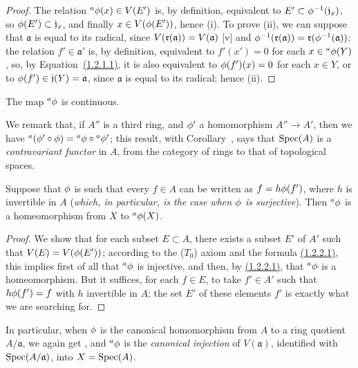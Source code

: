 \begin{proof}
\label{proof-1.1.2.2}
The relation ${}^a\phi(x)\in V(E')$ is, by definition, equivalent to $E'\subset\phi^{-1}(\mathfrak{j}_x)$, so $\phi(E')\subset\mathfrak{j}_x$, and finally $x\in V(\phi(E'))$, hence (i).
To prove (ii), we can suppose that $\mathfrak{a}$ is equal to its radical, since $V(\mathfrak{r}(\mathfrak{a}))=V(\mathfrak{a})$ [v] and $\phi^{-1}(\mathfrak{r}(\mathfrak{a}))=\mathfrak{r}(\phi^{-1}(\mathfrak{a}))$;
the relation $f'\in\mathfrak{a}'$ is, by definition, equivalent to $f'(x')=0$ for each $x\in{{}^a\phi(Y)}$, so, by Equation~\hyperref[1.1.2.1]{(1.2.1.1)}, it is also equivalent to $\phi(f')(x)=0$ for each $x\in Y$, or to $\phi(f')\in\mathfrak{j}(Y)=\mathfrak{a}$, since $\mathfrak{a}$ is equal to its radical;
hence (ii).
\end{proof}

\begin{corollary}[1.2.3]
\label{1.1.2.3}
The map ${}^a\phi$ is continuous.
\end{corollary}

We remark that, if $A''$ is a third ring, and $\phi'$ a homomorphism $A''\to A'$, then we have ${}^a(\phi'\circ\phi)={}^a\phi\circ{}^a\phi'$;
this result, with Corollary~, says that $\operatorname{Spec}(A)$ is a \emph{contravariant functor} in $A$, from the category of rings to that of topological spaces.

\begin{corollary}[1.2.4]
\label{1.1.2.4}
Suppose that $\phi$ is such that every $f\in A$ can be written as $f=h\phi(f')$, where $h$ is invertible in $A$ (\emph{which, in particular, is the case when $\phi$ is \emph{surjective}}).
Then ${}^a\phi$ is a homeomorphism from $X$ to ${}^a\phi(X)$.
\end{corollary}

\begin{proof}
\label{proof-1.1.2.4}
We show that for each subset $E\subset A$, there exists a subset $E'$ of $A'$ such that $V(E)=V(\phi(E'))$;
according to the ($T_0$) axiom  and the formula \hyperref[1.1.2.2]{(1.2.2.1)}, this implies first of all that ${}^a\phi$ is injective, and then, by \hyperref[1.1.2.2]{(1.2.2.1)}, that ${}^a\phi$ is a homeomorphism.
But it suffices, for each $f\in E$, to take $f'\in A'$ such that $h\phi(f')=f$ with $h$ invertible in $A$;
the set $E'$ of these elements $f'$ is exactly what we are searching for.
\end{proof}

\begin{env}[1.2.5]
\label{1.1.2.5}
In particular, when $\phi$ is the canonical homomorphism from $A$ to a ring quotient $A/\mathfrak{a}$, we again get , and ${}^a\phi$ is the \emph{canonical injection} of $V(\mathfrak{a})$, identified with $\operatorname{Spec}(A/\mathfrak{a})$, into $X=\operatorname{Spec}(A)$.
\end{env}

